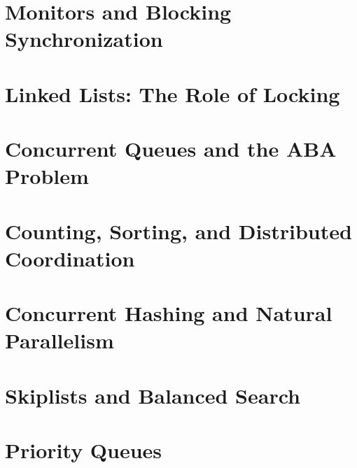 \documentclass[letter,12pt]{report}
\begin{document}
\chapter{Monitors and Blocking Synchronization}



\chapter{Linked Lists: The Role of Locking}




\chapter{Concurrent Queues and the ABA Problem}





\chapter{Counting, Sorting, and Distributed Coordination}



\chapter{Concurrent Hashing and Natural Parallelism}




\chapter{Skiplists and Balanced Search}





\chapter{Priority Queues}


\end{document}
